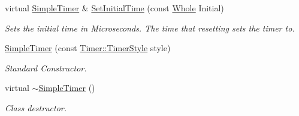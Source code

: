 \begin{DoxyCompactItemize}
virtual \hyperlink{classMezzanine_1_1SimpleTimer}{SimpleTimer} \& \hyperlink{classMezzanine_1_1SimpleTimer_a88f8a89917ab32aa409d6bab5bc4603a}{SetInitialTime} (const \hyperlink{namespaceMezzanine_adcbb6ce6d1eb4379d109e51171e2e493}{Whole} Initial)
\begin{DoxyCompactList}\small\item\em Sets the initial time in Microseconds. The time that resetting sets the timer to. \item\end{DoxyCompactList}\item 
\hyperlink{classMezzanine_1_1SimpleTimer_a0487972b9181d90a38759449fc223452}{SimpleTimer} (const \hyperlink{classMezzanine_1_1Timer_a1db436d4e0d6f1676e41ba3cb2ea3aaa}{Timer::TimerStyle} style)
\begin{DoxyCompactList}\small\item\em Standard Constructor. \item\end{DoxyCompactList}\item 
\hypertarget{classMezzanine_1_1SimpleTimer_ae865561febcb6e7ef2dfc99f5af0571a}{
virtual \hyperlink{classMezzanine_1_1SimpleTimer_ae865561febcb6e7ef2dfc99f5af0571a}{$\sim$SimpleTimer} ()}
\label{classMezzanine_1_1SimpleTimer_ae865561febcb6e7ef2dfc99f5af0571a}

\begin{DoxyCompactList}\small\item\em Class destructor. \item\end{DoxyCompactList}\end{DoxyCompactItemize}
